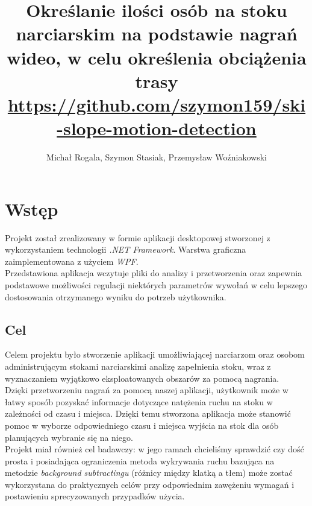 \documentclass[a4paper]{article}
\title{Określanie ilości osób na stoku narciarskim na podstawie nagrań wideo, w celu określenia obciążenia trasy\\
\small \url{https://github.com/szymon159/ski-slope-motion-detection}}
\date{}
\author{Michał Rogala, Szymon Stasiak, Przemysław Woźniakowski}
\begin{document}
  \maketitle

\section{Wstęp}
Projekt został zrealizowany w formie aplikacji desktopowej stworzonej z wykorzystaniem technologii \textit{.NET Framework}. Warstwa graficzna zaimplementowana z użyciem \textit{WPF}.\\
Przedstawiona aplikacja wczytuje pliki do analizy i przetworzenia oraz zapewnia podstawowe możliwości regulacji niektórych parametrów wywołań w celu lepszego dostosowania otrzymanego wyniku do potrzeb użytkownika.

\subsection{Cel}
Celem projektu było stworzenie aplikacji umożliwiającej narciarzom oraz osobom administrującym stokami narciarskimi analizę zapełnienia stoku, wraz z wyznaczaniem wyjątkowo eksploatowanych obszarów za pomocą nagrania.\\
Dzięki przetworzeniu nagrań za pomocą naszej aplikacji, użytkownik może w łatwy sposób pozyskać informacje dotyczące natężenia ruchu na stoku w zależności od czasu i miejsca. Dzięki temu stworzona aplikacja może stanowić pomoc w wyborze odpowiedniego czasu i miejsca wyjścia na stok dla osób planujących wybranie się na niego.\\
Projekt miał również cel badawczy: w jego ramach chcieliśmy sprawdzić czy dość prosta i posiadająca ograniczenia metoda wykrywania ruchu bazująca na metodzie \textit{background subtractingu} (różnicy między klatką a tłem) może zostać wykorzystana do praktycznych celów przy odpowiednim zawężeniu wymagań i postawieniu sprecyzowanych przypadków użycia.
\end{document}

